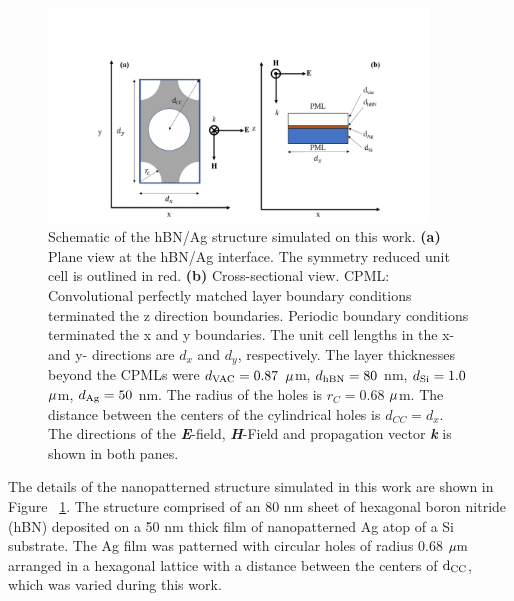 \documentclass[
reprint,
amsmath,amssymb,
aip,
jap,
floatfix,
]{revtex4-2}
\begin{document}
      \begin{figure}[!htb]
        \centering\includegraphics[width=0.9\textwidth]{FiguresCh4/StructurehBNAgHex.png}
        \caption{Schematic of the hBN/Ag structure simulated on this work. \textbf{(a)} Plane view at the hBN/Ag interface. The symmetry reduced unit cell is outlined in red. \textbf{(b)} Cross-sectional view. CPML: Convolutional perfectly matched layer boundary conditions terminated the z direction boundaries. Periodic boundary conditions terminated the x and y boundaries. The unit cell lengths in the x- and y- directions are $d_{x} $ and $d_{y}$, respectively. The layer thicknesses beyond the CPMLs were $d_{\rm{VAC}} = 0.87$ $\rm \mu$m, $d_{\rm{hBN}} = 80$ nm, $d_{\rm{Si}} = 1.0$ $\rm \mu$m, $d_{\rm{Ag}} = 50$ nm. The radius of the holes is $r_{C} = 0.68$ $\rm \mu$m. The distance between the centers of the cylindrical holes is $d_{CC} = d_{x} $. The directions of the \textbf{\textit{E}}-field, \textbf{\textit{H}}-Field and propagation vector \textbf{\textit{k}} is shown in both panes.}
        \label{fig:1}
      \end{figure}

    The details of the nanopatterned structure simulated in this work are shown in Figure ~\ref{fig:1}. The structure comprised of an 80 nm sheet of hexagonal boron nitride (hBN) deposited on a 50 nm thick film of nanopatterned Ag atop of a Si substrate. The Ag film was patterned with circular holes of radius 0.68 $\rm \mu m$ arranged in a hexagonal lattice with a distance between the centers of $\rm d_{CC}$, which was varied during this work.

\end{document}

